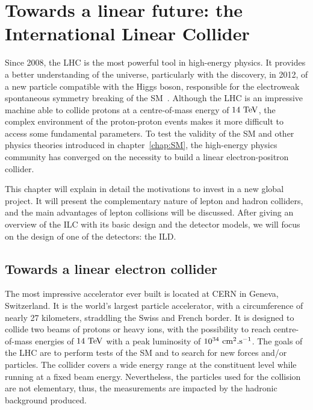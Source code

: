 \chapter{Towards a linear future: the International Linear Collider}
\label{chap:ILC}

  Since 2008, the \gls{LHC} is the most powerful tool in high-energy physics.
  It provides a better understanding of the universe, particularly with the discovery, in 2012, of a new particle compatible with the Higgs boson, responsible for the electroweak spontaneous symmetry breaking of the \acrfull{SM}~\cite{Aad2012, Chatrchyan2012}.
  Although the \gls{LHC} is an impressive machine able to collide protons at a centre-of-mass energy of $14~\rm{TeV}$, the complex environment of the proton-proton events makes it more difficult to access some fundamental parameters. 
  To test the validity of the \gls{SM} and other physics theories introduced in chapter~\ref{chap:SM}, the high-energy physics community has converged on the necessity to build a linear electron-positron collider.
  
  This chapter will explain in detail the motivations to invest in a new global project. 
  It will present the complementary nature of lepton and hadron colliders, and the main advantages of lepton collisions will be discussed.
  After giving an overview of the \gls{ILC} with its basic design and the detector models, we will focus on the design of one of the detectors: the \gls{ILD}.

 \minitoc
  
  \section{Towards a linear electron collider}
 
  The most impressive accelerator ever built is located at \gls{CERN} in Geneva, Switzerland. 
  It is the world's largest particle accelerator, with a circumference of nearly 27 kilometers, straddling the Swiss and French border.
  It is designed to collide two beams of protons or heavy ions, with the possibility to reach centre-of-mass energies of $14~\rm{TeV}$ with a peak luminosity of $10^{34}~\rm{cm}^2\rm{.s}^{-1}$.
  The goals of the \gls{LHC} are to perform tests of the \gls{SM} and to search for new forces and/or particles. 
  The collider covers a wide energy range at the constituent level while running at a fixed beam energy.
  Nevertheless, the particles used for the collision are not elementary, thus, the measurements are impacted by the hadronic background produced.
  
